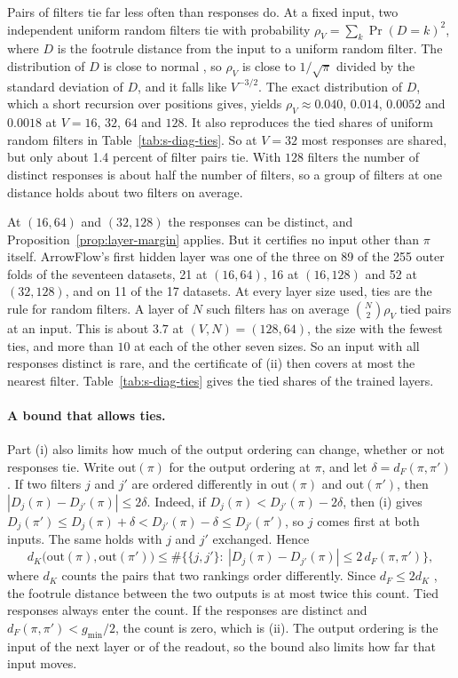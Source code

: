 Pairs of filters tie far less often than responses do. At a fixed input, two independent uniform random filters tie with probability $\rho_V=\sum_k\Pr(D=k)^2$, where $D$ is the footrule distance from the input to a uniform random filter. The distribution of $D$ is close to normal \citep{diaconis1977footrule}, so $\rho_V$ is close to $1/\sqrt{\pi}$ divided by the standard deviation of $D$, and it falls like $V^{-3/2}$. The exact distribution of $D$, which a short recursion over positions gives, yields $\rho_V\approx0.040$, $0.014$, $0.0052$ and $0.0018$ at $V=16$, $32$, $64$ and $128$. It also reproduces the tied shares of uniform random filters in Table~\ref{tab:s-diag-ties}. So at $V=32$ most responses are shared, but only about 1.4 percent of filter pairs tie. With $128$ filters the number of distinct responses is about half the number of filters, so a group of filters at one distance holds about two filters on average.

At $(16,64)$ and $(32,128)$ the responses can be distinct, and Proposition~\ref{prop:layer-margin} applies. But it certifies no input other than $\pi$ itself. ArrowFlow's first hidden layer was one of the three on 89 of the 255 outer folds of the seventeen datasets, 21 at $(16,64)$, 16 at $(16,128)$ and 52 at $(32,128)$, and on 11 of the 17 datasets. At every layer size used, ties are the rule for random filters. A layer of $N$ such filters has on average $\binom N2\rho_V$ tied pairs at an input. This is about $3.7$ at $(V,N)=(128,64)$, the size with the fewest ties, and more than $10$ at each of the other seven sizes. So an input with all responses distinct is rare, and the certificate of (ii) then covers at most the nearest filter. Table~\ref{tab:s-diag-ties} gives the tied shares of the trained layers.

\paragraph{A bound that allows ties.} Part (i) also limits how much of the output ordering can change, whether or not responses tie. Write $\mathrm{out}(\pi)$ for the output ordering at $\pi$, and let $\delta=d_F(\pi,\pi')$. If two filters $j$ and $j'$ are ordered differently in $\mathrm{out}(\pi)$ and $\mathrm{out}(\pi')$, then $|D_j(\pi)-D_{j'}(\pi)|\le2\delta$. Indeed, if $D_j(\pi)<D_{j'}(\pi)-2\delta$, then (i) gives $D_j(\pi')\le D_j(\pi)+\delta<D_{j'}(\pi)-\delta\le D_{j'}(\pi')$, so $j$ comes first at both inputs. The same holds with $j$ and $j'$ exchanged. Hence
\[
d_K\bigl(\mathrm{out}(\pi),\mathrm{out}(\pi')\bigr)\le\#\bigl\{\{j,j'\}:\ |D_j(\pi)-D_{j'}(\pi)|\le2\,d_F(\pi,\pi')\bigr\},
\]
where $d_K$ counts the pairs that two rankings order differently. Since $d_F\le2d_K$ \citep{diaconis1977footrule}, the footrule distance between the two outputs is at most twice this count. Tied responses always enter the count. If the responses are distinct and $d_F(\pi,\pi')<g_{\min}/2$, the count is zero, which is (ii). The output ordering is the input of the next layer or of the readout, so the bound also limits how far that input moves.

